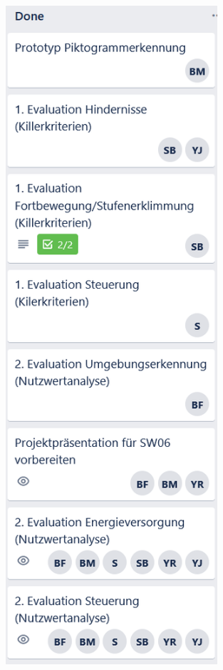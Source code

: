     
    \begin{figure}[H]
  \centering
  \begin{minipage}[t]{0.45\linewidth}
  \includegraphics[width=0.7\textwidth]{img/Trello/Trello-Bord_2_Nr1.PNG}

\end{minipage}
\end{figure}
